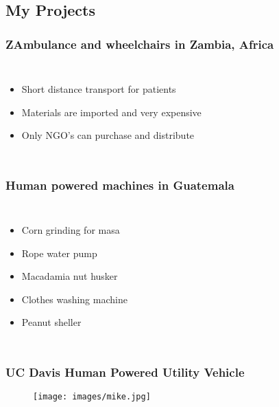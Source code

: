 \documentclass[]{beamer}
\begin{document}
\subsection{My Projects}
\frame
{
  \frametitle{ZAmbulance and wheelchairs in Zambia, Africa}
  \begin{columns}[t]
    \column{6cm}
    \begin{itemize}[<+->]
      \item Short distance transport for patients
      \item Materials are imported and very expensive
      \item Only NGO's can purchase and distribute
    \end{itemize}
    \column{5cm}
  \end{columns}
}
\frame
{
  \frametitle{Human powered machines in Guatemala}
  \begin{columns}[t]
    \column{6cm}
    \begin{itemize}[<+->]
      \item Corn grinding for masa
      \item Rope water pump
      \item Macadamia nut husker
      \item Clothes washing machine
      \item Peanut sheller
    \end{itemize}
    \column{5cm}
  \end{columns}
}
\frame
{
  \frametitle{UC Davis Human Powered Utility Vehicle}
  \begin{center}
    \begin{figure}[]
      \texttt{[image: images/mike.jpg]}
    \end{figure}
  \end{center}
}
\end{document}
